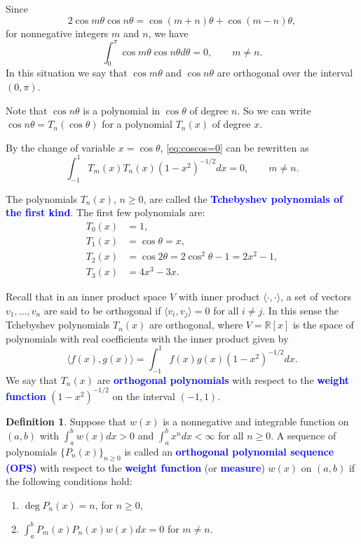\documentclass[oneside]{book}
\numberwithin{equation}{section}
\theoremstyle{definition}
\newtheorem{defn}[thm]{Definition}
\newcommand{\RR}{\mathbb{R}}
\renewcommand\emph[1]{\textcolor{blue}{\bf #1}}
\begin{document}
Since
\[
  2\cos m\theta \cos n\theta  = \cos(m+n)\theta + \cos(m-n)\theta,
\]
for nonnegative integers \( m \) and \( n \), we have
\begin{equation}\label{eq:coscos=0}
  \int_0^\pi \cos m\theta \cos n\theta d\theta = 0, \qquad m\ne n.
\end{equation}
In this situation we say that \( \cos m\theta \) and
\( \cos n\theta \) are orthogonal over the interval \( (0,\pi) \).

Note that \( \cos n\theta \) is a polynomial in \( \cos\theta \) of
degree \( n \). So we can write \( \cos n\theta = T_n(\cos\theta) \)
for a polynomial \( T_n(x) \) of degree \( x \).

By the change of variable \( x=\cos \theta \), \eqref{eq:coscos=0} can
be rewritten as
\[
  \int_{-1}^1 T_m(x)T_n(x) (1-x^2)^{-1/2} dx = 0, \qquad m\ne n.
\]

The polynomials \( T_n(x) \), \( n\ge0 \), are called the
\emph{Tchebyshev polynomials of the first kind}.
The first few polynomials are:
\begin{align*}
 T_0(x) &= 1, \\
 T_1(x) &= \cos\theta = x, \\
 T_2(x) &= \cos2\theta = 2\cos^2\theta-1 = 2x^2-1, \\
 T_3(x) &= 4x^3-3x.
\end{align*}

Recall that in an inner product space \( V \) with inner product
\( \langle \cdot,\cdot \rangle \), a set of vectors
\( v_1,\dots,v_n \) are said to be orthogonal if
\( \langle v_i,v_j \rangle = 0 \) for all \( i\ne j \). In this sense
the Tchebyshev polynomials \( T_n(x) \) are orthogonal, where
\( V = \RR[x] \) is the space of polynomials with real coefficients
with the inner product given by
\[
  \langle f(x), g(x) \rangle = \int_{-1}^1 f(x)g(x) (1-x^2)^{-1/2} dx.
\]
We say that \( T_n(x) \) are \emph{orthogonal polynomials} with
respect to the \emph{weight function} \( (1-x^2)^{-1/2} \) on the
interval \( (-1,1) \).

\begin{defn}\label{def:OPS1}
  Suppose that \( w(x) \) is a nonnegative and integrable function on
  \( (a,b) \) with \( \int_a^b w(x)dx >0 \) and
  \( \int_a^b x^n dx < \infty \) for all \( n\ge0 \). A sequence of
  polynomials \( \{P_n(x)\}_{n\ge0} \) is called an \emph{orthogonal
    polynomial sequence (OPS)} with respect to the \emph{weight
    function} (or \emph{measure}) \( w(x) \) on \( (a,b) \) if the
  following conditions hold:
  \begin{enumerate}
  \item \( \deg P_n(x) = n \), for \( n\ge0 \),
  \item \( \int_a^b P_m(x)P_n(x) w(x)dx = 0 \) for \( m\ne n \).
  \end{enumerate}
\end{defn}
\end{document}
